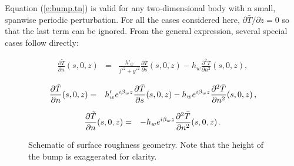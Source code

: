 Equation (\ref{e:bump.tn}) is valid for any two-dimensional body with a small,
spanwise periodic perturbation.  For all the cases considered here, $\partial
\bar T/\partial z = 0$ so that the last term can be ignored.  From the general
expression, several special cases follow directly:

\medskip
{}

\begin{eqnarray} \label{e:2dtn}
  \frac{\partial \tilde T}{\partial n}(s,0,z) &=& 
         \frac{h'_w}{f'^2 + g'^2} 
         \frac{\partial \bar T}{\partial s}(s,0,z) - 
	 h_w \frac{\partial^2 \bar T}{\partial n^2}(s,0,z) \comma
\end{eqnarray}

\medskip
{}

\begin{eqnarray} \label{e:fptn}
  \frac{\partial \tilde T}{\partial n}(s,0,z) &=& 
         h'_w e^{i {\beta_{w}} z} 
         \frac{\partial \bar T}{\partial s}(s,0,z)  -
         h_w e^{i {\beta_{w}} z} \frac{\partial^2 \bar T}{\partial n^2}(s,0,z) {\, ,}
\end{eqnarray}

\medskip
{}

\begin{eqnarray} \label{e:fpptn}
  \frac{\partial \tilde T}{\partial n}(s,0,z) &=& 
          - h_w e^{i {\beta_{w}} z} \frac{\partial^2 \bar T}{\partial n^2}(s,0,z) 
  {\, .}
\end{eqnarray}

%
%

\begin{figure}[p]
\centering
\epsfxsize=4.0in 
\caption [Schematic of surface roughness geometry]{Schematic of surface
roughness geometry. Note that the height of the bump is exaggerated for
clarity. \label{f:bump}}
\end{figure}

